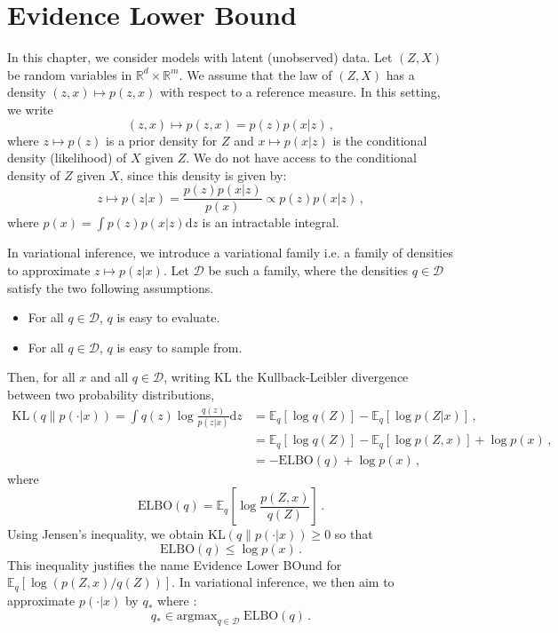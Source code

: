 \documentclass[english,graybox,envcountchap,envcountsame,sectrefs,shortlabels]{svmono}
\theoremstyle{style}
\begin{document}
\section*{Evidence Lower Bound}
In this chapter, we consider models with latent (unobserved) data. Let $(Z,X)$ be random variables in $\mathbb{R}^d\times \mathbb{R}^m$. We assume that the law of $(Z,X)$ has a density $(z,x)\mapsto p(z,x)$ with respect to a reference measure. In this setting, we write
$$
(z,x)\mapsto p(z,x) = p(z)p(x|z)\,,
$$
where $z\mapsto p(z)$ is a prior density for $Z$ and $x \mapsto p(x|z)$ is the conditional density (likelihood) of $X$ given $Z$. We do not have access to the conditional density of $Z$ given $X$, since this density is given by:
$$
z\mapsto p(z|x) = \frac{p(z)p(x|z)}{p(x)}\propto p(z)p(x|z)\,, 
$$
where $p(x) = \int p(z)p(x|z) \mathrm{d} z$ is an intractable integral.

\medskip

In variational inference, we introduce a variational family i.e. a family of densities to  approximate $z\mapsto p(z|x)$. Let $\mathcal{D}$ be such a family, where the densities $q \in\mathcal{D}$ satisfy the two following assumptions.
\begin{itemize}
\item For all $q\in \mathcal{D}$, $q$ is easy to evaluate.
\item For all $q\in \mathcal{D}$, $q$ is easy to sample from.
\end{itemize}

\medskip

Then, for all $x$ and all $q\in \mathcal{D}$, writing $\mathrm{KL}$ the Kullback-Leibler divergence between two probability distributions,
\begin{align*}
\mathrm{KL}\left(q\|p(\cdot|x)\right) = \int q(z) \log \frac{q(z)}{p(z|x)} \mathrm{d}z&= \mathbb{E}_{q}[\log q(Z)] - \mathbb{E}_{q}[\log p(Z|x)]\,,\\
 &= \mathbb{E}_{q}[\log q(Z)] - \mathbb{E}_{q}[\log p(Z,x)]+\log p(x)\,,\\
&= -\mathrm{ELBO}(q)+\log p(x)\,,
\end{align*}
where
$$
\mathrm{ELBO}(q) = \mathbb{E}_{q}\left[\log \frac{p(Z,x)}{q(Z)}\right]\,.
$$
Using Jensen's inequality, we obtain $\mathrm{KL}\left(q\|p(\cdot|x)\right) \geq 0$ so that
$$
\mathrm{ELBO}(q)\leq \log p(x)\,.
$$
This inequality justifies the name Evidence Lower BOund for $\mathbb{E}_{q}[\log (p(Z,x)/q(Z))]$. In variational inference, we then aim to approximate  $p(\cdot|x)$ by $q_{*}$ where :
$$
q_* \in \mathrm{argmax}_{q\in \mathcal{D}}\;\mathrm{ELBO}(q)\,.
$$
\end{document}
